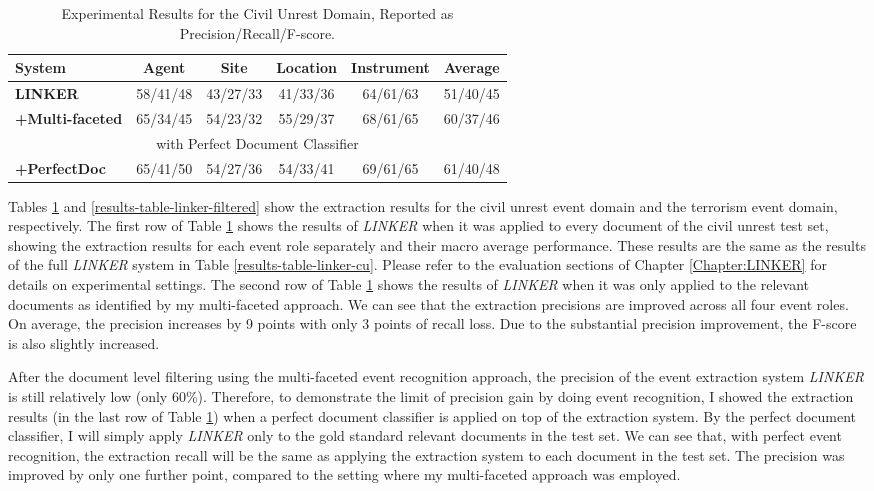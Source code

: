 \begin{table}[t]
\footnotesize
\centering
\begin{tabular}[center]{|l|cccc|c|} \hline
{\bf System} & {\bf Agent} & {\bf Site} & {\bf Location} & {\bf Instrument}  & {\bf Average} \\ \hline
{\bf LINKER} & 58/41/48 & 43/27/33 & 41/33/36 & 64/61/63 & 51/40/45\\ \hline
{\bf +Multi-faceted} & 65/34/45 & 54/23/32 & 55/29/37 & 68/61/65 & 60/37/46\\ \hline
\multicolumn{6}{|c|}{with Perfect Document Classifier} \\ \hline
{\bf +PerfectDoc} & 65/41/50 & 54/27/36 & 54/33/41 & 69/61/65 & 61/40/48 \\ \hline
\end{tabular}
\caption{Experimental Results for the Civil Unrest Domain, Reported as
  Precision/Recall/F-score.}
\label{results-table-linker-cu-filtered}
\end{table} 

Tables \ref{results-table-linker-cu-filtered} and 
\ref{results-table-linker-filtered} show the extraction results for 
the civil unrest event domain and the terrorism event domain, respectively. 
The first row of 
Table \ref{results-table-linker-cu-filtered} 
shows the results of {\it LINKER} 
when it was applied to every document of the civil unrest test set, 
showing the extraction results for each event role separately and their macro average performance. 
These results are the same as the results of the full {\it LINKER} system 
in Table \ref{results-table-linker-cu}. 
Please refer to the evaluation sections of Chapter \ref{Chapter:LINKER} 
for details on experimental settings.
The second row of Table \ref{results-table-linker-cu-filtered} shows the results 
of {\it LINKER} when it was only applied to the relevant documents as identified 
by my multi-faceted approach. 
We can see that the extraction precisions are improved across all four event roles. 
On average, the precision increases by 9 points with only 3 points of recall loss. 
Due to the 
substantial precision improvement, the F-score is also slightly increased. 

After the document level filtering using the multi-faceted event recognition approach, 
the precision of the event extraction system {\it LINKER} is still relatively low (only 60\%).
Therefore, to demonstrate the limit of precision gain by doing event recognition, 
I showed the extraction results 
(in the last row of Table \ref{results-table-linker-cu-filtered}) when 
a perfect document classifier is applied on top of the extraction system.
By the perfect document classifier, I will simply apply {\it LINKER} 
only to the gold standard relevant documents in the test set. 
We can see that, with perfect event recognition, the extraction recall 
will be the same as applying the extraction system to each document in the test set. 
The precision was improved by only one further point, compared to the setting where 
my multi-faceted  approach was employed.


